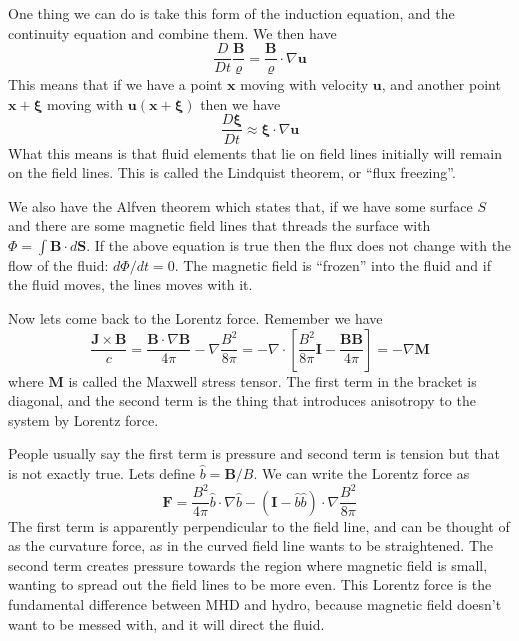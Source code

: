 \documentclass[letterpaper, 11pt]{article}
\numberwithin{equation}{section}
\numberwithin{figure}{section}
\begin{document}
One thing we can do is take this form of the induction equation, and the
continuity equation and combine them. We then have
\begin{equation}
  \label{eq:8}
  \frac{D}{Dt}\frac{\mathbf{B}}{\varrho} = \frac{\mathbf{B}}{\varrho}\cdot \nabla \mathbf{u}
\end{equation}
This means that if we have a point $\mathbf{x}$ moving with velocity
$\mathbf{u}$, and another point $\mathbf{x} + \boldsymbol{\xi}$ moving with
$\mathbf{u}(\mathbf{x} + \boldsymbol{\xi})$ then we have
\begin{equation}
  \label{eq:9}
  \frac{D\boldsymbol{\xi}}{D t} \approx \boldsymbol{\xi}\cdot \nabla \mathbf{u}
\end{equation}
What this means is that fluid elements that lie on field lines initially will
remain on the field lines. This is called the Lindquist theorem, or ``flux freezing''.

We also have the Alfven theorem which states that, if we have some surface $S$
and there are some magnetic field lines that threads the surface with $\Phi =
\int \mathbf{B}\cdot d\mathbf{S}$. If the above equation is true then the flux
does not change with the flow of the fluid: $d\Phi/dt = 0$. The magnetic field
is ``frozen'' into the fluid and if the fluid moves, the lines moves with it.

Now lets come back to the Lorentz force. Remember we have
\begin{equation}
  \label{eq:10}
  \frac{\mathbf{J}\times \mathbf{B}}{c} = \frac{\mathbf{B}\cdot \nabla \mathbf{B}}{4\pi} - \nabla \frac{B^2}{8\pi} = -\nabla\cdot \left[ \frac{B^2}{8\pi}\mathbf{I} - \frac{\mathbf{B} \mathbf{B}}{4\pi} \right] = -\nabla \mathbf{M}
\end{equation}
where $\mathbf{M}$ is called the Maxwell stress tensor. The first term in the
bracket is diagonal, and the second term is the thing that introduces anisotropy
to the system by Lorentz force.

People usually say the first term is pressure and second term is tension but
that is not exactly true. Lets define $\hat{b} = \mathbf{B}/B$. We can write
the Lorentz force as
\begin{equation}
  \label{eq:11}
  \mathbf{F} = \frac{B^2}{4\pi} \hat{b}\cdot\nabla \hat{b} - (\mathbf{I} - \hat{b} \hat{b})\cdot \nabla \frac{B^2}{8\pi}
\end{equation}
The first term is apparently perpendicular to the field line, and can be thought
of as the curvature force, as in the curved field line wants to be straightened.
The second term creates pressure towards the region where magnetic field is
small, wanting to spread out the field lines to be more even. This Lorentz force
is the fundamental difference between MHD and hydro, because magnetic field
doesn't want to be messed with, and it will direct the fluid.
\end{document}
